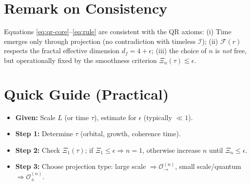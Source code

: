 \section{Remark on Consistency}
Equations \eqref{eq:qr-core}–\eqref{eq:rule} are consistent with the QR axioms:
(i) Time emerges only through projection (no contradiction with timeless \(\mathcal{I}\));
(ii) \(\mathcal{F}(r)\) respects the fractal effective dimension \(d_f=4+\epsilon\);
(iii) the choice of \(n\) is \emph{not} free, but operationally fixed by the smoothness criterion
\(\Xi_n(\tau)\lesssim \epsilon\).

\section{Quick Guide (Practical)}
\begin{itemize}
  \item \textbf{Given:} Scale \(L\) (or time \(\tau\)), estimate for \(\epsilon\) (typically \(\ll 1\)).
  \item \textbf{Step 1:} Determine \(\tau\) (orbital, growth, coherence time).
  \item \textbf{Step 2:} Check \(\Xi_1(\tau)\); if \(\Xi_1\le\epsilon\Rightarrow n=1\),
  otherwise increase \(n\) until \(\Xi_n\le\epsilon\).
  \item \textbf{Step 3:} Choose projection type: large scale \(\Rightarrow \mathcal{O}^{(n)}_{\rightarrow}\),
  small scale/quantum \(\Rightarrow \mathcal{O}^{(n)}_{\pm}\).
\end{itemize}